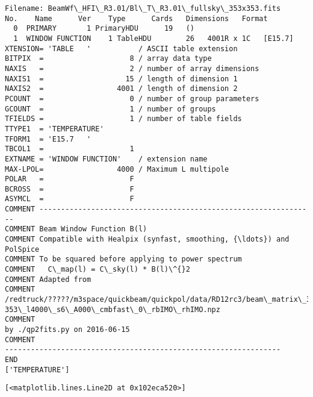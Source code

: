 \documentclass[11pt]{article}
\makeatletter
\newcommand{\boxspacing}{\kern\kvtcb@left@rule\kern\kvtcb@boxsep}
\newcommand{\prompt}[4]{
        {\ttfamily\llap{{\color{#2}[#3]:\hspace{3pt}#4}}\vspace{-\baselineskip}}
    }
\makeatother
\begin{document}
    \begin{Verbatim}[commandchars=\\\{\}]
Filename: BeamWf\_HFI\_R3.01/Bl\_T\_R3.01\_fullsky\_353x353.fits
No.    Name      Ver    Type      Cards   Dimensions   Format
  0  PRIMARY       1 PrimaryHDU      19   ()
  1  WINDOW FUNCTION    1 TableHDU        26   4001R x 1C   [E15.7]
XTENSION= 'TABLE   '           / ASCII table extension
BITPIX  =                    8 / array data type
NAXIS   =                    2 / number of array dimensions
NAXIS1  =                   15 / length of dimension 1
NAXIS2  =                 4001 / length of dimension 2
PCOUNT  =                    0 / number of group parameters
GCOUNT  =                    1 / number of groups
TFIELDS =                    1 / number of table fields
TTYPE1  = 'TEMPERATURE'
TFORM1  = 'E15.7   '
TBCOL1  =                    1
EXTNAME = 'WINDOW FUNCTION'    / extension name
MAX-LPOL=                 4000 / Maximum L multipole
POLAR   =                    F
BCROSS  =                    F
ASYMCL  =                    F
COMMENT ----------------------------------------------------------------
COMMENT Beam Window Function B(l)
COMMENT Compatible with Healpix (synfast, smoothing, {\ldots}) and PolSpice
COMMENT To be squared before applying to power spectrum
COMMENT   C\_map(l) = C\_sky(l) * B(l)\^{}2
COMMENT Adapted from
COMMENT
/redtruck/?????/m3space/quickbeam/quickpol/data/RD12rc3/beam\_matrix\_353xCOMMENT
353\_l4000\_s6\_A000\_cmbfast\_0\_rbIMO\_rhIMO.npz                             COMMENT
by ./qp2fits.py on 2016-06-15                                           COMMENT
----------------------------------------------------------------        END
['TEMPERATURE']
    \end{Verbatim}

            \begin{tcolorbox}[breakable, size=fbox, boxrule=.5pt, pad at break*=1mm, opacityfill=0]
\prompt{Out}{outcolor}{10}{\boxspacing}
\begin{Verbatim}[commandchars=\\\{\}]
[<matplotlib.lines.Line2D at 0x102eca520>]
\end{Verbatim}
\end{tcolorbox}
        
    \begin{center}
    \end{center}
    { \hspace*{\fill} \\}
    
\end{document}
